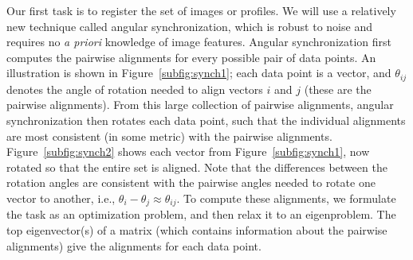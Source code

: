 \documentclass{pnastwo}
\begin{document}
\begin{article}
Our first task is to register the set of images or profiles.
%
%
%
We will use a relatively new technique called angular synchronization\cite{singer2011angular}, which is robust to noise and requires no {\em a priori} knowledge of image features.
%
Angular synchronization first computes the pairwise alignments %
for every possible pair of data points. %
%
An illustration is shown in Figure~\ref{subfig:synch1};
each data point is a vector, and $\theta_{ij}$ denotes the angle of rotation needed to align vectors $i$ and $j$ (these are the pairwise alignments).
%
From this large collection of pairwise alignments, angular synchronization then rotates each data point, such that the individual alignments are most consistent (in some metric) with the pairwise alignments.
%
Figure~\ref{subfig:synch2} shows each vector from Figure~\ref{subfig:synch1}, now rotated so that the entire set is aligned.
%
Note that the differences between the rotation angles are consistent with the pairwise angles needed to rotate one vector to another, i.e., $\theta_i - \theta_j \approx \theta_{ij}$.
%
To compute these alignments, we formulate the task as an optimization problem, and then relax it to an eigenproblem.
%
The top eigenvector(s) of a matrix (which contains information about the pairwise alignments) give the alignments for each data point.
%


\end{article}
\end{document}
